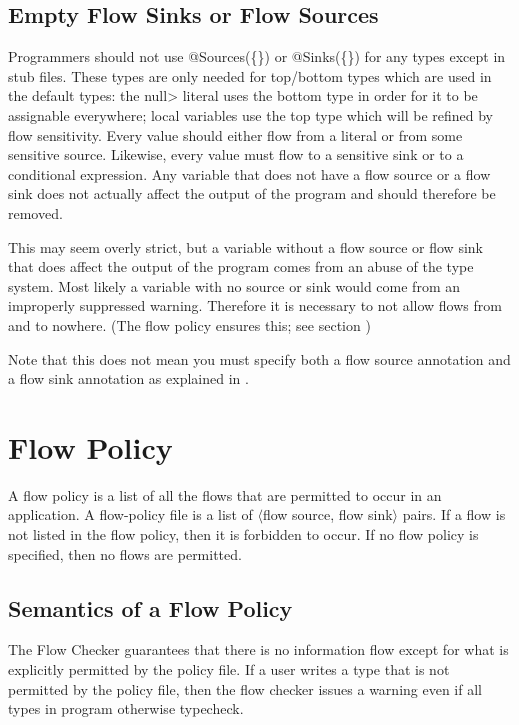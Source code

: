 \subsection{Empty Flow Sinks or Flow Sources\label{sec:emptyflow}}

Programmers should not use @Sources(\{\}) or @Sinks(\{\}) for
any types except in stub files.
These types are only needed for top/bottom types which are used in the
default types: the \<null> literal uses the bottom type in order for
it to be assignable everywhere; local variables use the top type which
will be refined by flow sensitivity.
Every value should either flow from a literal or from some sensitive
source.  Likewise, every value must flow to a sensitive sink or to a
conditional expression.  Any variable that does not have a flow source
or a flow sink does not actually affect the output of the program and
should therefore be removed.
  
This may seem overly strict, but a variable without a flow source or
flow sink that does affect the output of the program comes from an
abuse of the type system.  Most likely a variable with no source or
sink would come from an improperly suppressed warning. Therefore it is
necessary to not allow flows from and to nowhere.  (The flow policy
ensures this; see section )

Note that this does not mean you must specify both a flow source
annotation and a flow sink annotation as explained in
. 

 


\section{Flow Policy\label{sec:flow-policy}}

A flow policy is a list of all the flows that are permitted to occur in an application.
A flow-policy file is a list 
 of $\langle$flow source, flow sink$\rangle$ pairs.  If a flow is not listed in the flow policy, then 
 it is forbidden to occur.  If no flow policy is specified, then no flows are permitted. 
 
\subsection{Semantics of a Flow Policy}
\label{sec:undsiredflows}
The Flow Checker guarantees that there is no information
flow except for what is explicitly permitted by the policy file. If a user writes a type that is
not permitted by the policy file, then the flow checker issues a warning
even if all types in program otherwise typecheck.

